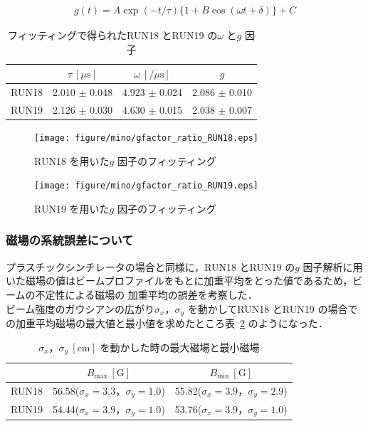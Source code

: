 \begin{gather}
g(t) = A\exp(-t / \tau)\{1+B\cos(\omega t+\delta)\}+C\label{eq:gfactor}
\end{gather}
\begin{table}[H]
\caption{フィッティングで得られたRUN18 とRUN19 の$\omega$ と$g$ 因子}
\centering
\begin{tabular}{cccc}\toprule
{} & $\tau~[\mu \mathrm{s}]$ & $\omega~[/\mu \mathrm{s}]$ & $g$ \\ \midrule
RUN18 & 2.010 $\pm$ 0.048 & 4.923 $\pm$ 0.024 & 2.086 $\pm$ 0.010  \\
RUN19 & 2.126 $\pm$ 0.030 & 4.630 $\pm$ 0.015 & 2.038 $\pm$ 0.007 \\ \bottomrule
\end{tabular}
\label{tab:gfactor_result}
\end{table}

\begin{figure}[H]
\begin{minipage}{0.5\hsize}
\texttt{[image: figure/mino/gfactor\_ratio\_RUN18.eps]}
\caption{RUN18 を用いた$g$ 因子のフィッティング}
\end{minipage}
\begin{minipage}{0.5\hsize}
\texttt{[image: figure/mino/gfactor\_ratio\_RUN19.eps]}
\caption{RUN19 を用いた$g$ 因子のフィッティング}
\end{minipage}
\end{figure}


\subsubsection{磁場の系統誤差について}

プラスチックシンチレータの場合と同様に，RUN18 とRUN19 の$g$ 因子解析に用いた磁場の値はビームプロファイルをもとに加重平均をとった値であるため，ビームの不定性による磁場の
加重平均の誤差を考察した．\\
ビーム強度のガウシアンの広がり$\sigma_{x}，\sigma_{y}$ を動かしてRUN18 とRUN19 の場合での加重平均磁場の最大値と最小値を求めたところ表~\ref{tab:mag_max_min} のようになった．

\begin{table}[H]
\caption{$\sigma_{x}，\sigma_{y}~[\mathrm{cm}]$ を動かした時の最大磁場と最小磁場}
\centering
\begin{tabular}{ccc}\toprule%
{} & $B_\mathrm{max}~[\mathrm{G}]$ &  $B_\mathrm{min}~[\mathrm{G}]$   \\ \midrule
RUN18 & 56.58\;($\sigma_{x}=3.3，\sigma_{y}=1.0$) & 55.82\;($\sigma_{x}=3.9，\sigma_{y}=2.9$)  \\
RUN19 & 54.44\;($\sigma_{x}=3.9，\sigma_{y}=1.0$) & 53.76\;($\sigma_{x}=3.9，\sigma_{y}=1.0$) \\ \bottomrule
\end{tabular}
\label{tab:mag_max_min}
\end{table}

